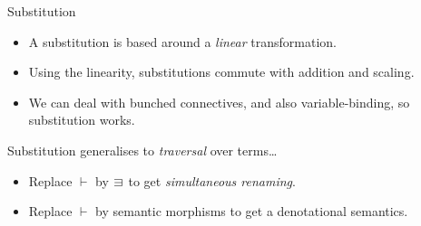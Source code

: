 \documentclass[fleqn]{beamer}
\begin{document}
\begin{frame}{Substitution}
  \begin{itemize}
    \item A substitution is based around a \emph{linear} transformation.
    \item Using the linearity, substitutions commute with addition and scaling.
    \item We can deal with bunched connectives, and also variable-binding, so substitution works.
  \end{itemize}
  \pause
  Substitution generalises to \emph{traversal} over terms\ldots
  \begin{itemize}
    \item Replace $\vdash$ by $\sqni$ to get \emph{simultaneous renaming}.
    \item Replace $\vdash$ by semantic morphisms to get a denotational semantics.
  \end{itemize}
\end{frame}

%
%
%
%
\end{document}
